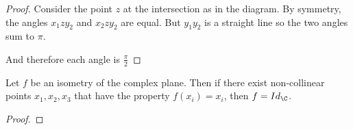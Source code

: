 \documentclass[../Main.tex]{subfiles}
\begin{document}
\begin{proof}
    Consider the point $z$ at the intersection as in the diagram. By symmetry, the angles $x_1 z y_2$ and $x_2 z y_2$ are equal. But $y_1 y_2$ is a straight line so the two angles sum to $\pi$.\par
    And therefore each angle is $\frac{\pi}{2}$
\end{proof}
\begin{lemma}
    Let $f$ be an isometry of the complex plane. Then if there exist non-collinear points $x_1, x_2, x_3$ that have the property $f(x_i) = x_i$, then $f = Id_\C$.
\end{lemma}
\begin{proof}
    
\end{proof}
\end{document}
